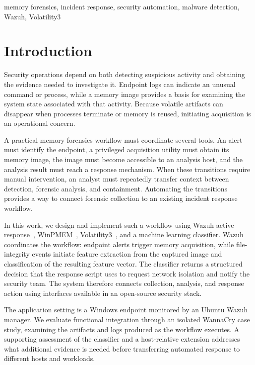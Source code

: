 \documentclass[conference]{IEEEtran}
\begin{document}
\begin{IEEEkeywords}
memory forensics, incident response, security automation, malware detection, Wazuh, Volatility3
\end{IEEEkeywords}

\section{Introduction}

Security operations depend on both detecting suspicious activity and obtaining the evidence needed to investigate it. Endpoint logs can indicate an unusual command or process, while a memory image provides a basis for examining the system state associated with that activity. Because volatile artifacts can disappear when processes terminate or memory is reused, initiating acquisition is an operational concern.

A practical memory forensics workflow must coordinate several tools. An alert must identify the endpoint, a privileged acquisition utility must obtain its memory image, the image must become accessible to an analysis host, and the analysis result must reach a response mechanism. When these transitions require manual intervention, an analyst must repeatedly transfer context between detection, forensic analysis, and containment. Automating the transitions provides a way to connect forensic collection to an existing incident response workflow.

In this work, we design and implement such a workflow using Wazuh active response~\cite{wazuh}, WinPMEM~\cite{winpmem}, Volatility3~\cite{volatility}, and a machine learning classifier. Wazuh coordinates the workflow: endpoint alerts trigger memory acquisition, while file-integrity events initiate feature extraction from the captured image and classification of the resulting feature vector. The classifier returns a structured decision that the response script uses to request network isolation and notify the security team. The system therefore connects collection, analysis, and response action using interfaces available in an open-source security stack.

The application setting is a Windows endpoint monitored by an Ubuntu Wazuh manager. We evaluate functional integration through an isolated WannaCry case study, examining the artifacts and logs produced as the workflow executes. A supporting assessment of the classifier and a host-relative extension addresses what additional evidence is needed before transferring automated response to different hosts and workloads.
\end{document}
